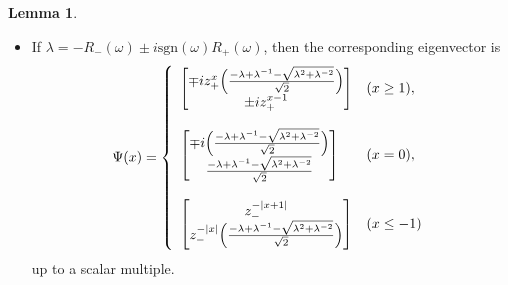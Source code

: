 \documentclass[a4paper,12pt]{article}
\theoremstyle{plain}
\theoremstyle{definition}
\newtheorem{lemma}[thm]{Lemma}
\theoremstyle{definition}
\begin{document}
\begin{lemma}
\begin{itemize}
\item[(ii)]If $\lambda = -R_-(\omega) \pm i \mathrm{sgn}(\omega)R_+(\omega)$, then the corresponding eigenvector is
\begin{eqnarray}
\Psi(x)=
\left\{\begin{array}{ll}
\begin{bmatrix}
\mp i z_{+}^{x} \Bigl(\frac{-\lambda +\lambda^{-1}-\sqrt{\lambda^2+\lambda^{-2}}}{\sqrt{2}} \Bigr) \\
\pm i z_{+}^{x-1}
\end{bmatrix} & (x\geq 1 ), \\\\
\begin{bmatrix}
    \mp i \Bigl(\frac{-\lambda +\lambda^{-1}-\sqrt{\lambda^2+\lambda^{-2}}}{\sqrt{2}} \Bigr) \\
    \frac{-\lambda +\lambda^{-1}-\sqrt{\lambda^2+\lambda^{-2}}}{\sqrt{2}}
\end{bmatrix} & (x=0), \\\\
\begin{bmatrix}
z_{-}^{-|x+1|} \\
z_{-}^{-|x|}\Bigl(\frac{-\lambda +\lambda^{-1}-\sqrt{\lambda^2+\lambda^{-2}}}{\sqrt{2}} \Bigr)
\end{bmatrix} & (x\leq -1)
\end{array}\right. \nonumber
\end{eqnarray}
up to a scalar multiple.
\end{itemize}
\end{lemma}
\end{document}
